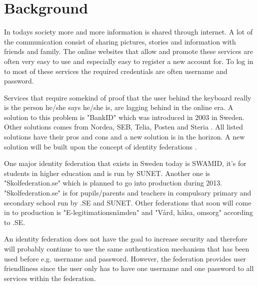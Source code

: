 \section{Background}
In todays society more and more information is shared through internet.
A lot of the communication consist of sharing pictures, stories and information with friends and family.
The online websites that allow and promote these services are often very easy to use and especially easy to register a new account for.
To log in to most of these services the required credentials are often username and password. 

Services that require somekind of proof that the user behind the keyboard really is the person he/she says he/she is, are lagging behind in the online era.
A solution to this problem is "BankID" which was introduced in 2003 \cite{website:bankid-about} in Sweden.
Other solutions comes from Nordea, SEB, Telia, Posten and Steria \cite[p.~256]{pdf:SOU}.
All listed solutions have their pros and cons and a new solution is in the horizon.
A new solution will be built upon the concept of identity federations \cite[p.~23]{pdf:SOU}.

One major identity federation that exists in Sweden today is SWAMID, it's for students in higher education and is run by SUNET.
Another one is "Skolfederation.se" which is planned to go into production during 2013.
"Skolfederation.se" is for pupils/parents and teachers in compulsary primary and secondary school run by .SE and SUNET. 
Other federations that soon will come in to production is "E-legitimationsn{\"a}mden" \cite{website:elegnamnd} and "V\r{a}rd, h{\"a}lsa, omsorg" according to .SE.  

An identity federation does not have the goal to increase security and therefore will probably continue to use the same authentication mechanism that has been used before e.g. username and password. 
However, the federation provides user friendliness since the user only has to have one username and one password to all services within the federation. 




